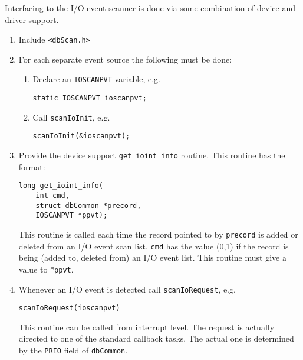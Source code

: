 
Interfacing to the I/O event scanner is done via some combination of device and driver support.

\begin{enumerate}\item Include \verb|<dbScan.h>|

\item For each separate event source the following must be done:

\begin{enumerate}

\item Declare an \verb|IOSCANPVT| variable, e.g.

\begin{verbatim}static IOSCANPVT ioscanpvt;
\end{verbatim}

\item Call \verb|scanIoInit|, e.g.

\begin{verbatim}scanIoInit(&ioscanpvt);
\end{verbatim}
\end{enumerate}

\item Provide the device support \verb|get_ioint_info| routine. This routine has the format:

\begin{verbatim}
long get_ioint_info(
    int cmd,
    struct dbCommon *precord,
    IOSCANPVT *ppvt);
\end{verbatim}

This routine is called each time the record pointed to by \verb|precord| is added or deleted from an I/O event scan list. 
\verb|cmd| has the value (0,1) if the record is being (added to, deleted from) an I/O event list. This routine must give a value to *\verb|ppvt|.

\item Whenever an I/O event is detected call \verb|scanIoRequest|, e.g.

\begin{verbatim}
scanIoRequest(ioscanpvt)
\end{verbatim}

This routine can be called from interrupt level. The request is actually directed to one of the standard callback 
tasks. The actual one is determined by the \verb|PRIO| field of \verb|dbCommon|. 

\end{enumerate}

